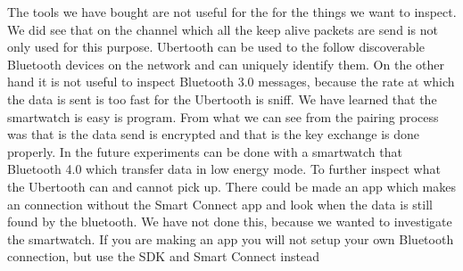 The tools we have bought are not useful for the for the things we want to inspect. We did see that on the channel which all the keep alive packets are send is not only used for this purpose. Ubertooth can be used to the follow discoverable Bluetooth devices on the network and can uniquely identify them. On the other hand it is not useful to inspect Bluetooth 3.0 messages, because the rate at which the data is sent is too fast for the Ubertooth is sniff. We have learned that the smartwatch is easy is program. From what we can see from the pairing process was that is the data send is encrypted and that is the key exchange is done properly. 
In the future experiments can be done with a smartwatch that Bluetooth 4.0 which transfer data in low energy mode. 
To further inspect what the Ubertooth can and cannot pick up. There could be made an app which makes an connection without the Smart Connect app and look when the data is still found by the bluetooth. We have not done this, because we wanted to investigate the smartwatch. If you are making an app you will not setup your own Bluetooth connection, but use the SDK and Smart Connect instead
